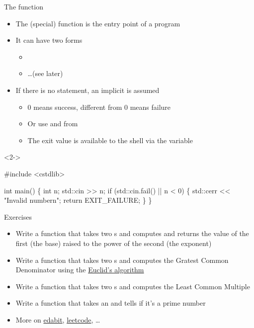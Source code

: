 \begin{frame}[fragile]{The  function}
  \begin{itemize}
  \item The  (special) function is the entry point of a program
  \item It can have two forms
    \begin{itemize}
    \item {}
    \item \ldots (see later)
    \end{itemize}
  \item<2-> If there is no  statement, an implicit  is assumed
    \begin{itemize}
    \item $0$ means success, different from $0$ means failure
    \item Or use  and  from 
    \item The exit value is available to the shell via the  variable
    \end{itemize}
  \end{itemize}

  \begin{codeblock}<2->{
#include <cstdlib>

int main() \{
  int n;
  std::cin >> n;
  if (std::cin.fail() || n < 0) \{
    std::cerr << "Invalid number\bslash{}n";
    return EXIT_FAILURE;
  \}
  \ddd
\}}\end{codeblock}

\end{frame}

\begin{frame}{Exercises}
  \begin{itemize}
  \item Write a function  that takes two s and computes and
    returns the value of the first (the base) raised to the power of the second
    (the exponent)
  \item Write a function  that takes two s and computes the
    Gratest Common Denominator using the
    \href{https://en.wikipedia.org/wiki/Euclidean_algorithm}{Euclid's algorithm}
  \item Write a function  that takes two s and computes the
    Least Common Multiple
  \item Write a function  that takes an  and tells if
    it's a prime number
  \item More on \href{https://edabit.com/}{edabit}, \href{https://leetcode.com/}{leetcode}, \ldots
  \end{itemize}

\end{frame}


